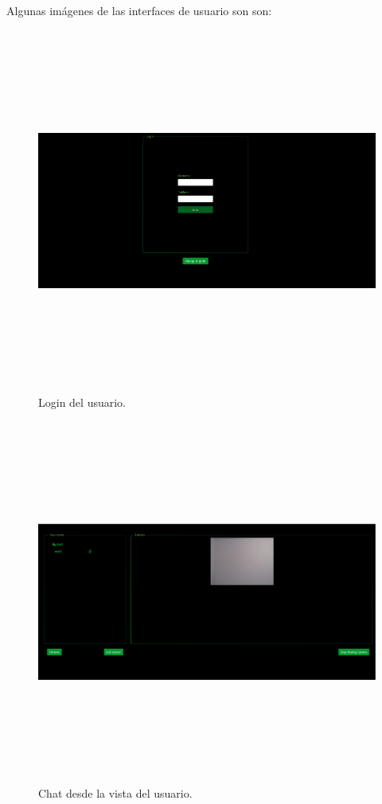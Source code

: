 Algunas imágenes de las interfaces de usuario son son:
\FloatBarrier
\begin{figure}[h]
    \centering
    \includegraphics[width=12cm,height=12cm,keepaspectratio]{img/Login.png}
    \caption{Login del usuario.}
    \label{fig:Login del usuario}
\end{figure}
\FloatBarrier
\FloatBarrier
\begin{figure}[h]
    \centering
    \includegraphics[width=12cm,height=12cm,keepaspectratio]{img/UserChatDesktop.png}
    \caption{Chat desde la vista del usuario.}
    \label{fig:Chat desde la vista del usuario}
\end{figure}
